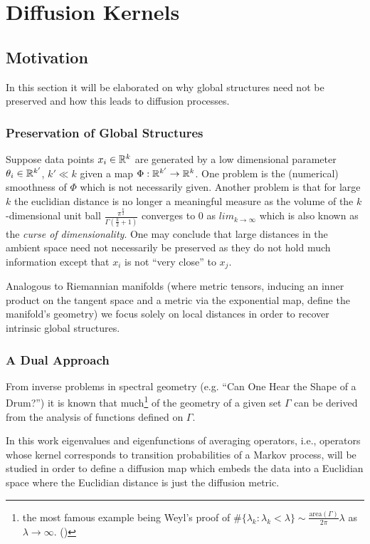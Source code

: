 \section{Diffusion Kernels}
\subsection{Motivation}
In this section it will be elaborated on why global structures need not be preserved and how this leads to diffusion processes.
\subsubsection{Preservation of Global Structures}
Suppose data points $x_i \in \mathbb{R}^k$ are generated by a low dimensional parameter $\theta_i \in \mathbb{R}^{k'}$, $k' \ll k$ given a map $\Phi: \mathbb{R}^{k'} \rightarrow \mathbb{R}^k$. One problem is the (numerical) smoothness of $\Phi$ which is not necessarily given.
Another problem is that for large $k$ the euclidian distance is no longer a meaningful measure as the volume of the $k$-dimensional unit ball $\frac{\pi^\frac{k}{2}}{\Gamma(\frac{k}{2}+1)}$ converges to $0$ as $lim_{k\rightarrow\infty}$ which is also known as the \textit{curse of dimensionality}. One may conclude that large distances in the ambient space need not necessarily be preserved as they do not hold much information except that $x_i$ is not ``very close'' to $x_j$.

Analogous to Riemannian manifolds (where metric tensors, inducing an inner product on the tangent space and a metric via the exponential map, define the manifold's geometry) we focus solely on local distances in order to recover intrinsic global structures.

\subsubsection{A Dual Approach}
From inverse problems in spectral geometry (e.g. ``Can One Hear the Shape of a Drum?'') it is known that much\footnote{the most famous example being Weyl's proof of $\#\{\lambda_k : \lambda_k < \lambda\} \sim \frac{\text{area}(\Gamma)}{2\pi}\lambda$ as $\lambda \rightarrow \infty$. (\cite{AnalysisOnManifolds})} of the geometry of a given set $\Gamma$ can be derived from the analysis of functions defined on $\Gamma$.

In this work eigenvalues and eigenfunctions of averaging operators, i.e., operators whose kernel corresponds to transition probabilities of a Markov process, will be studied in order to define a diffusion map which embeds the data into a Euclidian space where the Euclidian distance is just the diffusion metric.


